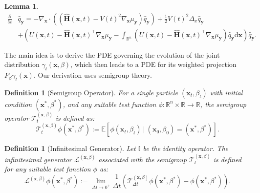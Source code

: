 \documentclass{article}
\numberwithin{equation}{section}
\newtheorem{lemma}[theorem]{Lemma}
\newtheorem{definition}[theorem]{Definition}
\newcommand{\dif}{{\mathrm{d}}}
\def\vx{{\bm{x}}}
\def\vy{{\bm{y}}}
\def\mH{{\bm{H}}}
\def\gT{{\mathcal{T}}}
\def\sI{{\mathbb{I}}}
\newcommand{\Ls}{\mathcal{L}}
\begin{document}
\begin{lemma}
    \begin{equation}
            \label{eqn: PDE of posterior diffusion app2}
            \begin{aligned}
            \frac{\partial}{\partial t}&\widehat{q}_{\vy} = -\nabla_{\vx} \cdot \left(\left(\widehat{\mH}(\vx,t)-V(t)^2\nabla_{\vx}\mu_{\vy}\right)\widehat{q}_{\vy}\right)
            +\frac{1}{2}V(t)^2\Delta_{x}\widehat{q}_{\vy}\\
            &+\left(U(\vx,t) - \widehat{\mH}(\vx,t)^\intercal\nabla_{\vx}\mu_{\vy} - \int_{\mathbb{R}^n}\left(U(\vx,t) - \widehat{\mH}(\vx,t)^\intercal\nabla_{\vx}\mu_{\vy}\right)\widehat{q}_{\vy}\dif \vx\right)\widehat{q}_{\vy}.
            \end{aligned}
        \end{equation}
\end{lemma}

The main idea is to derive the PDE governing the evolution of the joint distribution $\gamma_{t}(\vx,\beta)$, which then leads to a PDE for its weighted projection $P_{\beta}\gamma_{t}(\vx)$. Our derivation uses semigroup theory. 

\begin{definition}[Semigroup Operator]
    \label{def:semigroup}
    For a single particle $(\vx_t,\beta_t)$ with initial condition $(\vx^\ast,\beta^\ast)$, and any suitable test function $\phi:\mathbb{R}^n \times \mathbb{R} \rightarrow \mathbb{R}$, the semigroup operator $\gT^{(\vx,\beta)}_{t}$ is defined as:
    \begin{equation}
        \gT^{(\vx,\beta)}_{t}\phi(\vx^\ast,\beta^\ast) := \mathbb{E}\left[\phi(\vx_t,\beta_t) \ | \ (\vx_0,\beta_0) = (\vx^\ast, \beta^\ast)\right].
        \label{eqn: defn of semigroup}
    \end{equation}
\end{definition}

\begin{definition}[Infinitesimal Generator]
    \label{def:infinitesimal_generator}
    Let $\sI$ be the identity operator. The infinitesimal generator $\Ls^{(\vx,\beta)}$ associated with the semigroup $\gT^{(\vx,\beta)}_{t}$ is defined for any suitable test function $\phi$ as:
    \begin{equation}
        \Ls^{(\vx,\beta)}\phi\left(\vx^\ast,\beta^\ast\right) := \lim_{\Delta t \rightarrow 0^{+}}\frac{1}{\Delta t}\left(\gT^{(\vx,\beta)}_{\Delta t}\phi(\vx^\ast,\beta^\ast) - \phi(\vx^\ast,\beta^\ast)\right).
        \label{eqn: defn of infinitesimal generator}
    \end{equation}
\end{definition}
\end{document}
